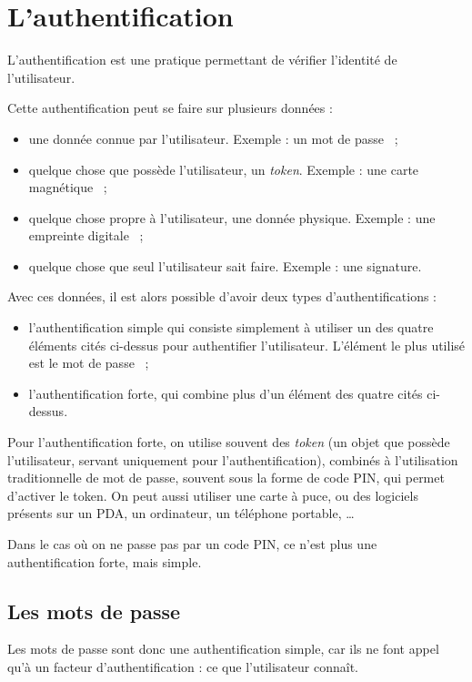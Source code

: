 \section{L'authentification}
L'authentification est une pratique permettant de vérifier
l'identité de l'utilisateur.

Cette authentification peut se faire sur plusieurs données : 
\begin{itemize}
  \item une donnée connue par l'utilisateur. Exemple : un mot de
passe ~;
  \item quelque chose que possède l'utilisateur, un \emph{token}.
Exemple : une carte magnétique ~;
  \item quelque chose propre à l'utilisateur, une donnée physique.
Exemple : une empreinte digitale ~;
  \item quelque chose que seul l'utilisateur sait faire. Exemple :
une signature.
\end{itemize}

Avec ces données, il est alors possible d'avoir deux types
d'authentifications : 
\begin{itemize}
  \item l'authentification simple qui consiste simplement à
utiliser un des quatre éléments cités ci-dessus pour authentifier
l'utilisateur. L'élément le plus utilisé est le mot de passe ~;
  \item l'authentification forte, qui combine plus d'un élément
des quatre cités ci-dessus.
\\
\end{itemize}

Pour l'authentification forte, on utilise souvent des
\emph{token} (un objet que possède l'utilisateur, servant
uniquement pour l'authentification), 
combinés à l'utilisation traditionnelle de mot de passe, souvent
sous la forme de code PIN, qui permet d'activer le token.
On peut aussi utiliser une carte à puce, ou des logiciels présents
sur un PDA, un ordinateur, un téléphone portable, …

Dans le cas où on ne passe pas par un code PIN, ce n'est plus une
authentification forte, mais simple.

\subsection{Les mots de passe}
Les mots de passe sont donc une authentification simple, car ils
ne font appel qu'à un facteur d'authentification : ce que
l'utilisateur connaît. 

